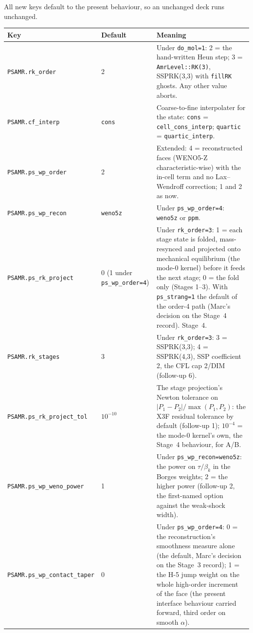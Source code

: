 \documentclass[11pt,a4paper]{article}
\newcommand{\code}[1]{\texttt{\small #1}}
\begin{document}
All new keys default to the present behaviour, so an unchanged deck runs
unchanged.
\begin{center}
\small
\begin{tabular}{llp{}}
\toprule
Key & Default & Meaning \\
\midrule
\code{PSAMR.rk\_order} & 2 & Under \code{do\_mol=1}: 2 = the hand-written Heun step; 3 = \code{AmrLevel::RK(3)}, SSPRK(3,3) with \code{fillRK} ghosts. Any other value aborts. \\
\code{PSAMR.cf\_interp} & \code{cons} & Coarse-to-fine interpolater for the state: \code{cons} = \code{cell\_cons\_interp}; \code{quartic} = \code{quartic\_interp}. \\
\code{PSAMR.ps\_wp\_order} & 2 & Extended: 4 = reconstructed faces (WENO5-Z characteristic-wise) with the in-cell term and no Lax--Wendroff correction; 1 and 2 as now. \\
\code{PSAMR.ps\_wp\_recon} & \code{weno5z} & Under \code{ps\_wp\_order=4}: \code{weno5z} or \code{ppm}. \\
\code{PSAMR.ps\_rk\_project} & 0 (1 under \code{ps\_wp\_order=4}) & Under \code{rk\_order=3}: 1 = each stage state is folded, mass-resynced and projected onto mechanical equilibrium (the mode-0 kernel) before it feeds the next stage; 0 = the fold only (Stages 1--3). With \code{ps\_strang=1} the default of the order-4 path (Marc's decision on the Stage~4 record). Stage~4. \\
\code{PSAMR.rk\_stages} & 3 & Under \code{rk\_order=3}: 3 = SSPRK(3,3); 4 = SSPRK(4,3), SSP coefficient 2, the CFL cap 2/DIM (follow-up 6). \\
\code{PSAMR.ps\_rk\_project\_tol} & $10^{-10}$ & The stage projection's Newton tolerance on $|P_1-P_2|/\max(P_1,P_2)$: the X3F residual tolerance by default (follow-up 1); $10^{-4}$ = the mode-0 kernel's own, the Stage~4 behaviour, for A/B. \\
\code{PSAMR.ps\_wp\_weno\_power} & 1 & Under \code{ps\_wp\_recon=weno5z}: the power on $\tau/\beta_k$ in the Borges weights; 2 = the higher power (follow-up 2, the first-named option against the weak-shock width). \\
\code{PSAMR.ps\_wp\_contact\_taper} & 0 & Under \code{ps\_wp\_order=4}: 0 = the reconstruction's smoothness measure alone (the default, Marc's decision on the Stage~3 record); 1 = the H-5 jump weight on the whole high-order increment of the face (the present interface behaviour carried forward, third order on smooth $\alpha$). \\

\end{tabular}
\end{center}
\end{document}
